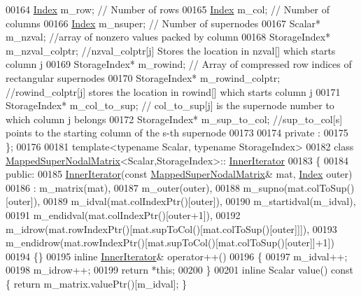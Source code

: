\begin{DoxyCode}
00164     \hyperlink{namespace_eigen_a62e77e0933482dafde8fe197d9a2cfde}{Index} m\_row; \textcolor{comment}{// Number of rows}
00165     \hyperlink{namespace_eigen_a62e77e0933482dafde8fe197d9a2cfde}{Index} m\_col; \textcolor{comment}{// Number of columns}
00166     \hyperlink{namespace_eigen_a62e77e0933482dafde8fe197d9a2cfde}{Index} m\_nsuper; \textcolor{comment}{// Number of supernodes}
00167     Scalar* m\_nzval; \textcolor{comment}{//array of nonzero values packed by column}
00168     StorageIndex* m\_nzval\_colptr; \textcolor{comment}{//nzval\_colptr[j] Stores the location in nzval[] which starts column j}
00169     StorageIndex* m\_rowind; \textcolor{comment}{// Array of compressed row indices of rectangular supernodes}
00170     StorageIndex* m\_rowind\_colptr; \textcolor{comment}{//rowind\_colptr[j] stores the location in rowind[] which starts column j}
00171     StorageIndex* m\_col\_to\_sup; \textcolor{comment}{// col\_to\_sup[j] is the supernode number to which column j belongs}
00172     StorageIndex* m\_sup\_to\_col; \textcolor{comment}{//sup\_to\_col[s] points to the starting column of the s-th supernode}
00173     
00174   private :
00175 \};
00176 
00181 \textcolor{keyword}{template}<\textcolor{keyword}{typename} Scalar, \textcolor{keyword}{typename} StorageIndex>
00182 \textcolor{keyword}{class }\hyperlink{group___sparse_l_u___module_class_eigen_1_1internal_1_1_mapped_super_nodal_matrix}{MappedSuperNodalMatrix}<Scalar,StorageIndex>::
      \hyperlink{class_eigen_1_1_inner_iterator}{InnerIterator}
00183 \{
00184   \textcolor{keyword}{public}:
00185      \hyperlink{class_eigen_1_1_inner_iterator}{InnerIterator}(\textcolor{keyword}{const} \hyperlink{group___sparse_l_u___module_class_eigen_1_1internal_1_1_mapped_super_nodal_matrix}{MappedSuperNodalMatrix}& mat, 
      \hyperlink{namespace_eigen_a62e77e0933482dafde8fe197d9a2cfde}{Index} outer)
00186       : m\_matrix(mat),
00187         m\_outer(outer),
00188         m\_supno(mat.colToSup()[outer]),
00189         m\_idval(mat.colIndexPtr()[outer]),
00190         m\_startidval(m\_idval),
00191         m\_endidval(mat.colIndexPtr()[outer+1]),
00192         m\_idrow(mat.rowIndexPtr()[mat.supToCol()[mat.colToSup()[outer]]]),
00193         m\_endidrow(mat.rowIndexPtr()[mat.supToCol()[mat.colToSup()[outer]]+1])
00194     \{\}
00195     \textcolor{keyword}{inline} \hyperlink{class_eigen_1_1_inner_iterator}{InnerIterator}& operator++()
00196     \{ 
00197       m\_idval++; 
00198       m\_idrow++;
00199       \textcolor{keywordflow}{return} *\textcolor{keyword}{this};
00200     \}
00201     \textcolor{keyword}{inline} Scalar value()\textcolor{keyword}{ const }\{ \textcolor{keywordflow}{return} m\_matrix.valuePtr()[m\_idval]; \}

\end{DoxyCode}

